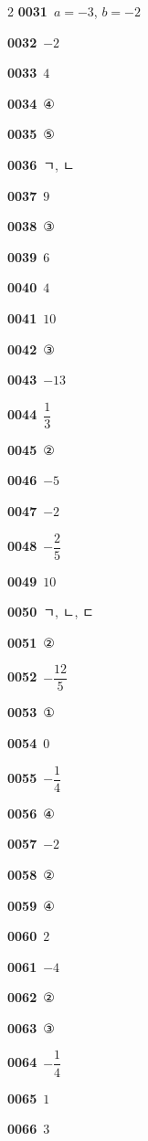 \documentclass[10pt,a4paper]{article}
\begin{document}
\begin{multicols}{2}
\noindent\textbf{0031}\ $a=-3$, $b=-2$\par
\noindent\textbf{0032}\ $-2$\par
\noindent\textbf{0033}\ $4$\par
\noindent\textbf{0034}\ ④\par
\noindent\textbf{0035}\ ⑤\par
\noindent\textbf{0036}\ ㄱ, ㄴ\par
\noindent\textbf{0037}\ $9$\par
\noindent\textbf{0038}\ ③\par
\noindent\textbf{0039}\ $6$\par
\noindent\textbf{0040}\ $4$\par
\noindent\textbf{0041}\ $10$\par
\noindent\textbf{0042}\ ③\par
\noindent\textbf{0043}\ $-13$\par
\noindent\textbf{0044}\ $\dfrac{1}{3}$\par
\noindent\textbf{0045}\ ②\par
\noindent\textbf{0046}\ $-5$\par
\noindent\textbf{0047}\ $-2$\par
\noindent\textbf{0048}\ $-\dfrac{2}{5}$\par
\noindent\textbf{0049}\ $10$\par
\noindent\textbf{0050}\ ㄱ, ㄴ, ㄷ\par
\noindent\textbf{0051}\ ②\par
\noindent\textbf{0052}\ $-\dfrac{12}{5}$\par
\noindent\textbf{0053}\ ①\par
\noindent\textbf{0054}\ $0$\par
\noindent\textbf{0055}\ $-\dfrac{1}{4}$\par
\noindent\textbf{0056}\ ④\par
\noindent\textbf{0057}\ $-2$\par
\noindent\textbf{0058}\ ②\par
\noindent\textbf{0059}\ ④\par
\noindent\textbf{0060}\ $2$\par
\noindent\textbf{0061}\ $-4$\par
\noindent\textbf{0062}\ ②\par
\noindent\textbf{0063}\ ③\par
\noindent\textbf{0064}\ $-\dfrac{1}{4}$\par
\noindent\textbf{0065}\ $1$\par
\noindent\textbf{0066}\ $3$\par

\end{multicols}
\end{document}
